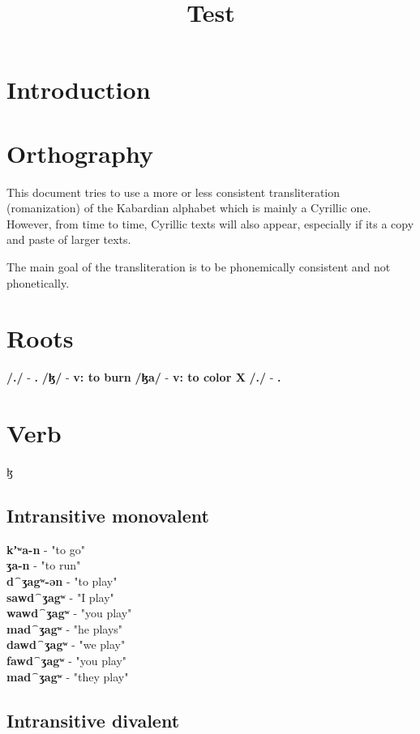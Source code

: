 \documentclass[a4paper,12pt]{book}
\title{Test}
\newcommand{\1}[1]{\textbf{\emph{#1}}} %
\newcommand{\2}[1]{\textbf{[#1]}} %
\newcommand{\3}[1]{\fontsize{11pt}{0cm}\textbf{\emph{#1}}} %
\newcommand{\4}[1]{\fontsize{10pt}{0cm}\emph{#1}}	%
\newcommand{\5}[1]{\textbf{/#1/}} %
\newcommand{\6}[1]{\textbf{[#1]}} %
\newcommand{\7}[1]{\fontsize{12pt}{0cm}\emph{#1}} %
\newcommand{\8}[1]{\fontsize{12pt}{0cm}`#1'} %
\newcommand{\9}[1]{\fontsize{12pt}{0cm}(lit. `#1')} %
\newcommand{\glossphonemics}[1]{\textbf{/#1/}} %
\begin{document}
\frontmatter
\maketitle\newpage
\setcounter{secnumdepth}{4}
\setcounter{tocdepth}{4}

\newpage
\mainmatter

\chapter{Introduction}
\chapter{Orthography}
This document tries to use a more or less consistent transliteration (romanization) of the Kabardian alphabet which is mainly a Cyrillic one. However, from time to time, Cyrillic texts will also appear, especially if its a copy and paste of larger texts.

The main goal of the transliteration is to be phonemically consistent and not phonetically.
\chapter{Roots}
\glossphonemics{.} - \textbf{.}
\glossphonemics{ɮ} - \textbf{v: to burn}
\glossphonemics{ɮa} - \textbf{v: to color X}
\glossphonemics{.} - \textbf{.}
\chapter{Verb}ɮ
\section{Intransitive monovalent}
\textbf{kʼʷa-n} - "to go"\\
\textbf{ʒa-n} - "to run"\\
\textbf{d⁀ʒagʷ-ən} - "to play"\\


\textbf{sawd⁀ʒagʷ} - "I play"\\
\textbf{wawd⁀ʒagʷ} - "you play"\\
\textbf{mad⁀ʒagʷ} - "he plays"\\
\textbf{dawd⁀ʒagʷ} - "we play"\\
\textbf{fawd⁀ʒagʷ} - "you play"\\
\textbf{mad⁀ʒagʷ} - "they play"\\


\section{Intransitive divalent}
\end{document}

